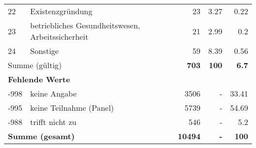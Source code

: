 \begin{longtable}{lXrrr}
        22 & \multicolumn{1}{X}{Existenzgründung} & %
          \num{23} &
          \num[round-mode=places,round-precision=2]{3.27} &
          \num[round-mode=places,round-precision=2]{0.22} \\

        23 & \multicolumn{1}{X}{betriebliches Gesundheitswesen, Arbeitssicherheit} & %
          \num{21} &
          \num[round-mode=places,round-precision=2]{2.99} &
          \num[round-mode=places,round-precision=2]{0.2} \\

        24 & \multicolumn{1}{X}{Sonstige} & %
          \num{59} &
          \num[round-mode=places,round-precision=2]{8.39} &
          \num[round-mode=places,round-precision=2]{0.56} \\

     \midrule
     \multicolumn{2}{l}{Summe (gültig)} &
       \textbf{\num{703}} &
     \textbf{\num{100}} &
       \textbf{\num[round-mode=places,round-precision=2]{6.7}} \\
     \multicolumn{5}{l}{\textbf{Fehlende Werte}}\\
       -998 &
       keine Angabe &
         \num{3506} &
        - &
         \num[round-mode=places,round-precision=2]{33.41} \\
       -995 &
       keine Teilnahme (Panel) &
         \num{5739} &
        - &
         \num[round-mode=places,round-precision=2]{54.69} \\
       -988 &
       trifft nicht zu &
         \num{546} &
        - &
         \num[round-mode=places,round-precision=2]{5.2} \\
     \midrule
     \multicolumn{2}{l}{\textbf{Summe (gesamt)}} &
          \textbf{\num{10494}} &
        \textbf{-} &
        \textbf{\num{100}} \\
     \bottomrule
     \end{longtable}
     
